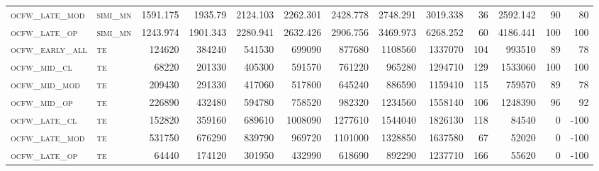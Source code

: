 \begin{landscape}
\begin{center}
\begin{footnotesize}
\begin{longtable}{llrrrrrrrr|rrr}
\textsc{ocfw\_late\_mod } & \textsc{simi\_mn  }   & 1591.175 & 1935.79  & 2124.103 & 2262.301 & 2428.778 & 2748.291 & 3019.338 & 36     & 2592.142      & 90            & 80              \\
\textsc{ocfw\_late\_op  } & \textsc{simi\_mn  }   & 1243.974 & 1901.343 & 2280.941 & 2632.426 & 2906.756 & 3469.973 & 6268.252 & 60     & 4186.441      & 100           & 100             \\
\textsc{ocfw\_early\_all} & \textsc{te  	  }   & 124620   & 384240   & 541530   & 699090   & 877680   & 1108560  & 1337070  & 104    & 993510        & 89            & 78              \\
\textsc{ocfw\_mid\_cl   } & \textsc{te        }   & 68220    & 201330   & 405300   & 591570   & 761220   & 965280   & 1294710  & 129    & 1533060       & 100           & 100             \\
\textsc{ocfw\_mid\_mod  } & \textsc{te        }   & 209430   & 291330   & 417060   & 517800   & 645240   & 886590   & 1159410  & 115    & 759570        & 89            & 78              \\
\textsc{ocfw\_mid\_op   } & \textsc{te        }   & 226890   & 432480   & 594780   & 758520   & 982320   & 1234560  & 1558140  & 106    & 1248390       & 96            & 92              \\
\textsc{ocfw\_late\_cl  } & \textsc{te        }   & 152820   & 359160   & 689610   & 1008090  & 1277610  & 1544040  & 1826130  & 118    & 84540         & 0             & -100            \\
\textsc{ocfw\_late\_mod } & \textsc{te        }   & 531750   & 676290   & 839790   & 969720   & 1101000  & 1328850  & 1637580  & 67     & 52020         & 0             & -100            \\
\textsc{ocfw\_late\_op  } & \textsc{te        }   & 64440    & 174120   & 301950   & 432990   & 618690   & 892290   & 1237710  & 166    & 55620         & 0             & -100           

\end{longtable}
\end{footnotesize}
\end{center}
\end{landscape}

\restoregeometry
\pagestyle{headings}


